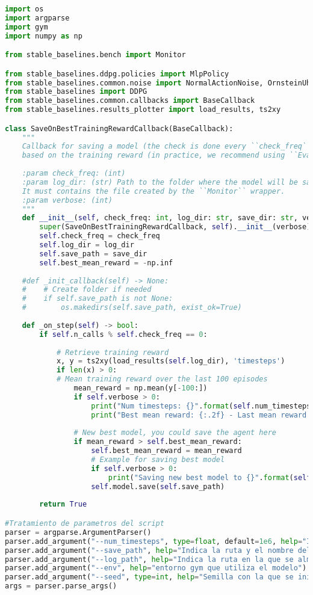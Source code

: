 \documentclass[11pt,fleqn]{book} %
\begin{document}
\begin{lstlisting}[language=python]
import os
import argparse
import gym
import numpy as np

from stable_baselines.bench import Monitor

from stable_baselines.ddpg.policies import MlpPolicy
from stable_baselines.common.noise import NormalActionNoise, OrnsteinUhlenbeckActionNoise, AdaptiveParamNoiseSpec
from stable_baselines import DDPG
from stable_baselines.common.callbacks import BaseCallback
from stable_baselines.results_plotter import load_results, ts2xy

class SaveOnBestTrainingRewardCallback(BaseCallback):
	"""
	Callback for saving a model (the check is done every ``check_freq`` steps)
	based on the training reward (in practice, we recommend using ``EvalCallback``).
	
	:param check_freq: (int)
	:param log_dir: (str) Path to the folder where the model will be saved.
	It must contains the file created by the ``Monitor`` wrapper.
	:param verbose: (int)
	"""
	def __init__(self, check_freq: int, log_dir: str, save_dir: str, verbose=1):
		super(SaveOnBestTrainingRewardCallback, self).__init__(verbose)
		self.check_freq = check_freq
		self.log_dir = log_dir
		self.save_path = save_dir
		self.best_mean_reward = -np.inf
	
	#def _init_callback(self) -> None:
	#    # Create folder if needed
	#    if self.save_path is not None:
	#        os.makedirs(self.save_path, exist_ok=True)
	
	def _on_step(self) -> bool:
		if self.n_calls % self.check_freq == 0:
	
			# Retrieve training reward
			x, y = ts2xy(load_results(self.log_dir), 'timesteps')
			if len(x) > 0:
			# Mean training reward over the last 100 episodes
				mean_reward = np.mean(y[-100:])
				if self.verbose > 0:
					print("Num timesteps: {}".format(self.num_timesteps))
					print("Best mean reward: {:.2f} - Last mean reward per episode: {:.2f}".format(self.best_mean_reward, mean_reward))
			
				# New best model, you could save the agent here
				if mean_reward > self.best_mean_reward:
					self.best_mean_reward = mean_reward
					# Example for saving best model
					if self.verbose > 0:
						print("Saving new best model to {}".format(self.save_path))
					self.model.save(self.save_path)
	
		return True

#Tratamiento de parametros del script
parser = argparse.ArgumentParser()
parser.add_argument("--num_timesteps", type=float, default=1e6, help="Indica el numero de timesteps que va a tener el entrenamiento, por defecto 1e6")
parser.add_argument("--save_path", help="Indica la ruta y el nombre del archivo en el que se va a almacenar el modelo.pkl")
parser.add_argument("--log_path", help="Indica la ruta en la que se almacena los logs del proceso de aprendizaje")
parser.add_argument("--env", help="entorno gym que utiliza el modelo")
parser.add_argument("--seed", type=int, help="Semilla con la que se inicia el entrenamiento del modelo")
args = parser.parse_args()


\end{lstlisting}
\end{document}
